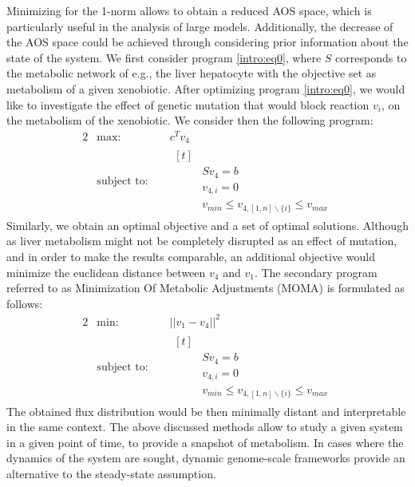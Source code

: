 Minimizing for the 1-norm allows to obtain a reduced AOS space, which is particularly useful in the analysis of large models. Additionally, the decrease of the AOS space could be achieved through considering prior information about the state of the system. We first consider program \ref{intro:eq0}, where $S$ corresponds to the metabolic network of e.g., the liver hepatocyte with the objective set as metabolism of a given xenobiotic. After optimizing program \ref{intro:eq0}, we would like to investigate the effect of genetic mutation that would block reaction $v_{i}$, on the metabolism of the xenobiotic. We consider then the following program:
\begin{alignat*}{2} 
  & \text{max: } & & c^{T}v_{4}  \\
   & \text{subject to: }&  & 
   				\begin{aligned}[t] \\
   				& Sv_{4}=b \\
   				& v_{4,i}=0  \\
                & v_{min} \leq v_{4,[1,n] \backslash \{i\} } \leq  v_{max}
                \end{aligned}
\end{alignat*}
Similarly, we obtain an optimal objective and a set of optimal solutions. Although as liver metabolism might not be completely disrupted as an effect of mutation, and in order to make the results comparable, an additional objective would minimize the euclidean distance between $v_{4}$ and $v_{1}$. The secondary program referred to as Minimization Of Metabolic Adjustments (MOMA) \cite{segre2002analysis} is formulated as follows:
\begin{alignat*}{2} 
  & \text{min: } & & ||v_{1} - v_{4}||^{2}  \\
   & \text{subject to: }&  & 
   				\begin{aligned}[t] \\
   				& Sv_{4}=b \\
   				& v_{4,i}=0  \\
                & v_{min} \leq v_{4,[1,n] \backslash \{i\} } \leq  v_{max}
                \end{aligned}
\end{alignat*}
The obtained flux distribution would be then minimally distant and interpretable in the same context.
The above discussed methods allow to study a given system in a given point of time, to provide a snapshot of metabolism. In cases where the dynamics of the system are sought, dynamic genome-scale frameworks provide an alternative to the steady-state assumption. 
